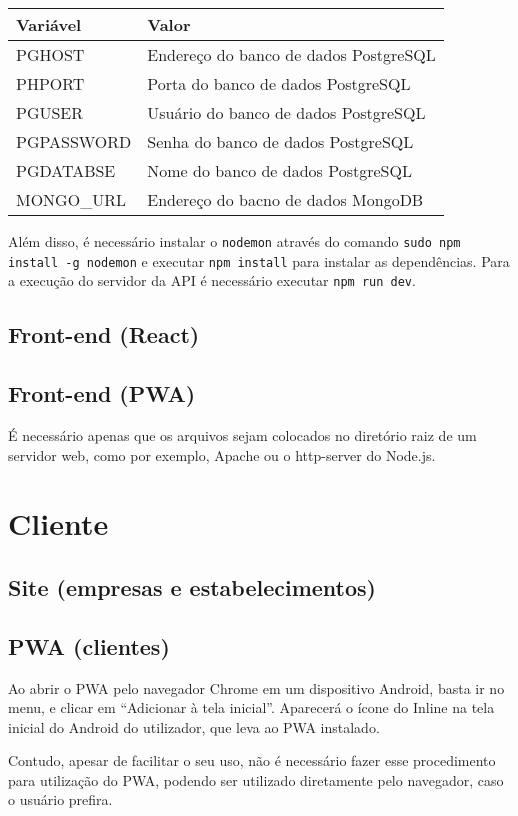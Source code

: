 \documentclass{book}
\begin{document}
\begin{tabular}{|l|l|}
\hline
Variável & Valor \\
\hline
PGHOST & Endereço do banco de dados PostgreSQL \\
\hline
PHPORT & Porta do banco de dados PostgreSQL \\
\hline
PGUSER & Usuário do banco de dados PostgreSQL \\
\hline
PGPASSWORD & Senha do banco de dados PostgreSQL \\
\hline
PGDATABSE & Nome do banco de dados PostgreSQL \\
\hline
MONGO\_URL & Endereço do bacno de dados MongoDB \\
\hline
\end{tabular}

Além disso, é necessário instalar o \verb|nodemon| através do comando
\verb|sudo npm install -g nodemon| e executar \verb|npm install| para instalar
as dependências. Para a execução do servidor da API é necessário executar
\verb|npm run dev|.

\subsection{Front-end (React)}

\subsection{Front-end (PWA)}
É necessário apenas que os arquivos sejam colocados no diretório raiz de um
servidor web, como por exemplo, Apache ou o http-server do Node.js.

\section{Cliente}
\subsection{Site (empresas e estabelecimentos)}
\subsection{PWA (clientes)}
Ao abrir o PWA pelo navegador Chrome em um dispositivo Android, basta ir no
menu, e clicar em ``Adicionar à tela inicial''. Aparecerá o ícone do Inline
na tela inicial do Android do utilizador, que leva ao PWA instalado.

Contudo, apesar de facilitar o seu uso, não é necessário fazer esse procedimento
para utilização do PWA, podendo ser utilizado diretamente pelo navegador, caso o
usuário prefira.
\end{document}
